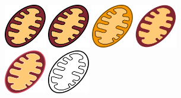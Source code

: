 \begin{figure}[H]
\begin{subfigure}[t]{0.2\linewidth}
    \end{subfigure}
    \hfill
    \begin{subfigure}[t]{0.75\linewidth}
        \includegraphics[width=0.2\textwidth]{chapters/images/mitochondria-black-lines}
        \hfill
        \includegraphics[width=0.2\textwidth]{chapters/images/mitochondria-black-lines}\hfill
        \includegraphics[width=0.2\textwidth]{chapters/images/mitochondria-yellow}\hfill
        \includegraphics[width=0.2\textwidth]{chapters/images/mitochondria-no-lines}
        \vspace{1em}
        \includegraphics[width=0.2\textwidth]{chapters/images/mitochondria-color-lines}\hfill
        \includegraphics[width=0.2\textwidth]{chapters/images/mitochondria-only-lines}\hfill

\end{subfigure}
\end{figure}
